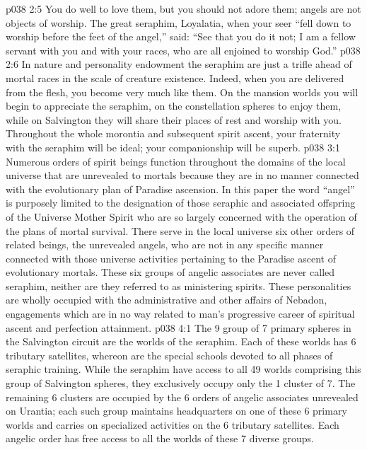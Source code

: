 \vs p038 2:5 \pc You do well to love them, but you should not adore them; angels are not objects of worship. The great seraphim, Loyalatia, when your seer “fell down to worship before the feet of the angel,” said: “See that you do it not; I am a fellow servant with you and with your races, who are all enjoined to worship God.”
\vs p038 2:6 In nature and personality endowment the seraphim are just a trifle ahead of mortal races in the scale of creature existence. Indeed, when you are delivered from the flesh, you become very much like them. On the mansion worlds you will begin to appreciate the seraphim, on the constellation spheres to enjoy them, while on Salvington they will share their places of rest and worship with you. Throughout the whole morontia and subsequent spirit ascent, your fraternity with the seraphim will be ideal; your companionship will be superb.
\vs p038 3:1 Numerous orders of spirit beings function throughout the domains of the local universe that are unrevealed to mortals because they are in no manner connected with the evolutionary plan of Paradise ascension. In this paper the word “angel” is purposely limited to the designation of those seraphic and associated offspring of the Universe Mother Spirit who are so largely concerned with the operation of the plans of mortal survival. There serve in the local universe six other orders of related beings, the unrevealed angels, who are not in any specific manner connected with those universe activities pertaining to the Paradise ascent of evolutionary mortals. These six groups of angelic associates are never called seraphim, neither are they referred to as ministering spirits. These personalities are wholly occupied with the administrative and other affairs of Nebadon, engagements which are in no way related to man’s progressive career of spiritual ascent and perfection attainment.
\vs p038 4:1 The 9 group of 7 primary spheres in the Salvington circuit are the worlds of the seraphim. Each of these worlds has 6 tributary satellites, whereon are the special schools devoted to all phases of seraphic training. While the seraphim have access to all 49 worlds comprising this group of Salvington spheres, they exclusively occupy only the 1 cluster of 7. The remaining 6 clusters are occupied by the 6 orders of angelic associates unrevealed on Urantia; each such group maintains headquarters on one of these 6 primary worlds and carries on specialized activities on the 6 tributary satellites. Each angelic order has free access to all the worlds of these 7 diverse groups.
